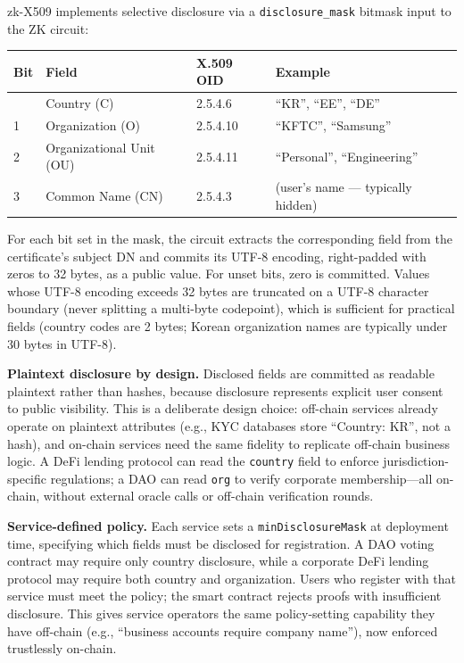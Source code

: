 \documentclass[11pt, a4paper]{article}
\begin{document}
zk-X509 implements selective disclosure via a \texttt{disclosure\_mask}
bitmask input to the ZK circuit:

\begin{longtable}[]{@{}llll@{}}
\toprule\noalign{}
Bit & Field & X.509 OID & Example \\
\midrule\noalign{}
\endhead
\bottomrule\noalign{}
\endlastfoot
0 & Country (C) & 2.5.4.6 & ``KR'', ``EE'', ``DE'' \\
1 & Organization (O) & 2.5.4.10 & ``KFTC'', ``Samsung'' \\
2 & Organizational Unit (OU) & 2.5.4.11 & ``Personal'', ``Engineering'' \\
3 & Common Name (CN) & 2.5.4.3 & (user's name --- typically hidden) \\
\end{longtable}

For each bit set in the mask, the circuit extracts the corresponding
field from the certificate's subject DN and commits its UTF-8 encoding,
right-padded with zeros to 32 bytes, as a public value. For unset bits,
zero is committed. Values whose UTF-8 encoding exceeds 32 bytes are
truncated on a UTF-8 character boundary (never splitting a multi-byte
codepoint), which is sufficient for practical fields (country codes are
2 bytes; Korean organization names are typically under 30 bytes in
UTF-8).

\textbf{Plaintext disclosure by design.} Disclosed fields are committed
as readable plaintext rather than hashes, because disclosure represents
explicit user consent to public visibility. This is a deliberate design
choice: off-chain services already operate on plaintext attributes
(e.g., KYC databases store ``Country: KR'', not a hash), and on-chain
services need the same fidelity to replicate off-chain business logic.
A DeFi lending protocol can read the \texttt{country} field to enforce
jurisdiction-specific regulations; a DAO can read \texttt{org} to verify
corporate membership---all on-chain, without external oracle calls or
off-chain verification rounds.

\textbf{Service-defined policy.} Each service sets a
\texttt{minDisclosureMask} at deployment time, specifying which fields
must be disclosed for registration. A DAO voting contract may require
only country disclosure, while a corporate DeFi lending protocol may
require both country and organization. Users who register with that
service must meet the policy; the smart contract rejects proofs with
insufficient disclosure. This gives service operators the same
policy-setting capability they have off-chain (e.g., ``business accounts
require company name''), now enforced trustlessly on-chain.
\end{document}
